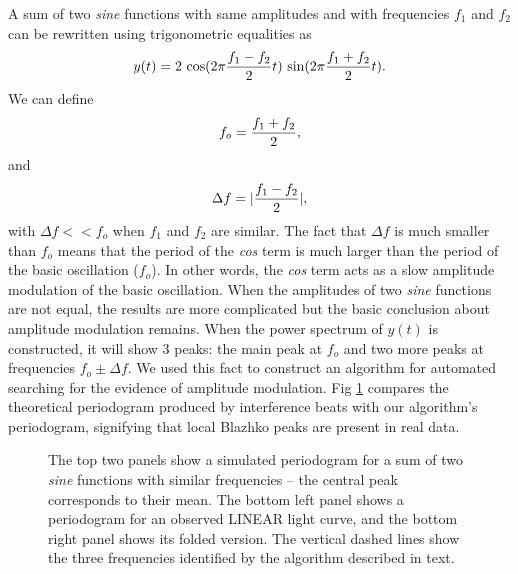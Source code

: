 A sum of two {\it sine} functions with same amplitudes and with frequencies $f_1$ and $f_2$ can be rewritten 
using trigonometric equalities as 
\begin{equation}
         y(t) = 2 \, \cos(2\pi{f_1-f_2\over 2} t) \, \sin(2\pi {f_1+f_2\over 2} t).
\end{equation} 
We can define 
\begin{equation}
         f_o = {f_1+f_2\over 2},
\end{equation} 
and 
\begin{equation}
         \Delta f = |{f_1-f_2\over 2}|,
\end{equation} 
with $\Delta f << f_o$ when $f_1$ and $f_2$ are similar. The fact that $\Delta f$ is much smaller than $f_o$ means
that the period of the {\it cos} term
is much larger than the period of the basic oscillation ($f_o$). In other words, the {\it cos} term acts as a slow
amplitude modulation of the basic oscillation. When the amplitudes of two {\it sine} functions are not equal, the
results are more complicated but the basic conclusion about amplitude modulation remains.
When the power spectrum of $y(t)$ is constructed, it will show 3 peaks: the main peak at $f_o$ and
two more peaks at frequencies $f_o \pm \Delta f$. We used this fact to construct an algorithm for
automated searching for the evidence of amplitude  modulation. 
Fig \ref{fig:periodogram} compares the theoretical periodogram produced by interference beats with our algorithm's periodogram,
signifying that local Blazhko peaks are present in real data.

\begin{figure}
  \centering
  \caption{The top two panels show a simulated periodogram for a sum of two {\it sine} functions with similar frequencies -- 
    the central peak corresponds to their mean. The bottom left panel shows a periodogram for an observed LINEAR light curve,
    and the bottom right panel shows its folded version. The vertical dashed lines show the three frequencies identified by the
     algorithm described in text.}
       \label{fig:periodogram}
\end{figure}


